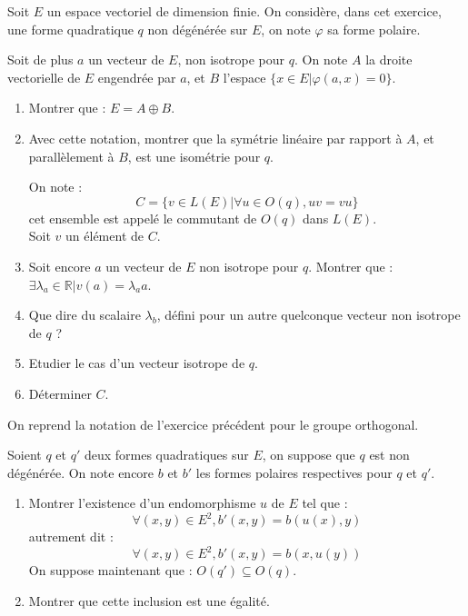 \newpage

\begin{center}
\end{center}

\begin{exer}
Soit $E$ un espace vectoriel de dimension finie. On considère, dans cet exercice, une forme quadratique $q$ non dégénérée sur $E$, on note $\varphi$ sa forme polaire.

Soit de plus $a$ un vecteur de $E$, non isotrope pour $q$. %
On note $A$ la droite vectorielle de $E$ engendrée par $a$, et $B$ l'espace $\{ x \in E | \varphi (a,x) = 0 \}$.
\begin{enumerate}
\item Montrer que : $E = A \oplus B$.
\item Avec cette notation, montrer que la symétrie linéaire par rapport à $A$, et parallèlement à $B$, est une isométrie pour $q$.

\medskip
On note :\[C = \{ v \in L(E) | \forall u \in O(q) , uv = vu\}\]
cet ensemble est appelé le commutant de $O(q)$ dans $L(E)$.\\
Soit $v$ un élément de $C$.
\item Soit encore $a$ un vecteur de $E$ non isotrope pour $q$. Montrer que : %
$\exists \lambda_a \in \mathbb{R} | v(a) = \lambda_a a$.
\item Que dire du scalaire $\lambda_b$, défini pour un autre quelconque vecteur non isotrope de $q$ ?
\item Etudier le cas d'un vecteur isotrope de $q$.
\item Déterminer $C$.
\end{enumerate}
\end{exer}

\begin{exer}[Condition de minimalité de $O(q)$]
On reprend la notation de l'exercice pr\'ec\'edent pour le groupe orthogonal.

\medskip
Soient $q$ et $q'$ deux formes quadratiques sur $E$, on suppose que $q$ est non dégénérée. %
On note encore $b$ et $b'$ les formes polaires respectives pour $q$ et $q'$.
\begin{enumerate}
\item Montrer l'existence d'un endomorphisme $u$ de $E$ tel que :
\[\forall (x,y) \in E^2 , b'(x,y) = b(u(x),y)\]
autrement dit :
\[\forall (x,y) \in E^2 , b'(x,y) = b(x,u(y))\]
On suppose maintenant que : $O(q') \subseteq O(q)$.
\item Montrer que cette inclusion est une égalité.
\end{enumerate}
\end{exer}

